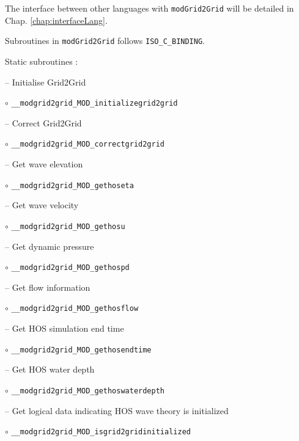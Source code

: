 The interface between other languages with \texttt{modGrid2Grid} will be detailed in Chap. \ref{chap:interfaceLang}. 

Subroutines in \texttt{modGrid2Grid} follows \texttt{ISO\_C\_BINDING}. 

\vspace{0.5cm}

Static subroutines : 

\vspace{0.5cm}

-- Initialise Grid2Grid

\hspace{0.5 cm} $\circ$ \texttt{\_\_modgrid2grid\_MOD\_initializegrid2grid}
\vspace{0.2cm}

-- Correct Grid2Grid

\hspace{0.5 cm} $\circ$ \texttt{\_\_modgrid2grid\_MOD\_correctgrid2grid}
\vspace{0.2cm}

-- Get wave elevation

\hspace{0.5 cm} $\circ$ \texttt{\_\_modgrid2grid\_MOD\_gethoseta}
\vspace{0.2cm}

-- Get wave velocity

\hspace{0.5 cm} $\circ$ \texttt{\_\_modgrid2grid\_MOD\_gethosu}
\vspace{0.2cm}

-- Get dynamic pressure

\hspace{0.5 cm} $\circ$ \texttt{\_\_modgrid2grid\_MOD\_gethospd}
\vspace{0.2cm}

-- Get flow information 

\hspace{0.5 cm} $\circ$ \texttt{\_\_modgrid2grid\_MOD\_gethosflow}
\vspace{0.2cm}

-- Get HOS simulation end time

\hspace{0.5 cm} $\circ$ \texttt{\_\_modgrid2grid\_MOD\_gethosendtime}
\vspace{0.2cm}

-- Get HOS water depth

\hspace{0.5 cm} $\circ$ \texttt{\_\_modgrid2grid\_MOD\_gethoswaterdepth}
\vspace{0.2cm}

-- Get logical data indicating HOS wave theory is initialized

\hspace{0.5 cm} $\circ$ \texttt{\_\_modgrid2grid\_MOD\_isgrid2gridinitialized}

